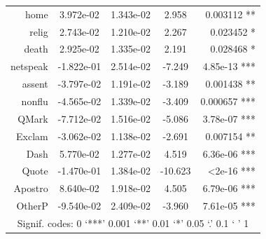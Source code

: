 \documentclass[bsc,frontabs,twoside,singlespacing,parskip,deptreport]{infthesis}
\begin{document}
\begin{table}[p]
{\begin{tabular}{rcccr}
home        & 3.972e-02  & 1.343e-02  & 2.958   & 0.003112 **                         \\
relig       & 2.743e-02  & 1.210e-02  & 2.267   & 0.023452 *                          \\
death       & 2.925e-02  & 1.335e-02  & 2.191   & 0.028468 *                          \\
netspeak    & -1.822e-01 & 2.514e-02  & -7.249  & 4.85e-13 ***                        \\
assent      & -3.797e-02 & 1.191e-02  & -3.189  & 0.001438 **                         \\
nonflu      & -4.565e-02 & 1.339e-02  & -3.409  & 0.000657 ***                        \\
QMark       & -7.712e-02 & 1.516e-02  & -5.086  & 3.78e-07 ***                        \\
Exclam      & -3.062e-02 & 1.138e-02  & -2.691  & 0.007154 **                         \\
Dash        & 5.770e-02  & 1.277e-02  & 4.519   & 6.36e-06 ***                        \\
Quote       & -1.470e-01 & 1.384e-02  & -10.623 & \textless 2e-16 ***                 \\
Apostro     & 8.640e-02  & 1.918e-02  & 4.505   & 6.79e-06 ***                        \\
OtherP      & -9.540e-02 & 2.409e-02  & -3.960  & 7.61e-05 ***                        \\ \hline
\multicolumn{5}{c}{Signif. codes:  0 ‘***’ 0.001 ‘**’ 0.01 ‘*’ 0.05 ‘.’ 0.1 ‘ ’ 1}    \\ \hline
\end{tabular}%
}
\end{table}
\end{document}
